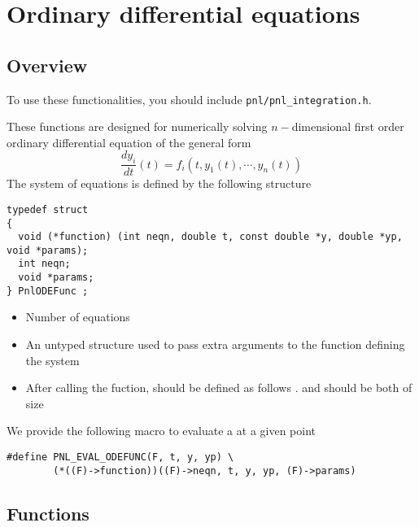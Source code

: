 \section{Ordinary differential equations}
\subsection{Overview}

To use these functionalities, you should include \verb!pnl/pnl_integration.h!.

These functions are designed for numerically solving $n-$dimensional first order
ordinary differential equation of the general form
\begin{equation*}
  \frac{dy_i}{dt}(t) = f_i(t, y_1(t), \cdots, y_n(t)) 
\end{equation*}
The system of equations is defined by the following structure
\begin{verbatim}
typedef struct
{
  void (*function) (int neqn, double t, const double *y, double *yp, void *params);
  int neqn; 
  void *params;
} PnlODEFunc ;
\end{verbatim}

\begin{itemize}
\item {} 
  \sshortdescribe Number of equations
\item {} 
  \sshortdescribe An untyped structure used to pass extra
  arguments to the function  defining the system
\item {}
  \sshortdescribe After calling the fuction,  should be defined as
  follows .  and  should be
  both of size 
\end{itemize}
We provide the following macro to evaluate a 
at a given point
\begin{verbatim}
#define PNL_EVAL_ODEFUNC(F, t, y, yp) \
        (*((F)->function))((F)->neqn, t, y, yp, (F)->params)
\end{verbatim}

\subsection{Functions}

